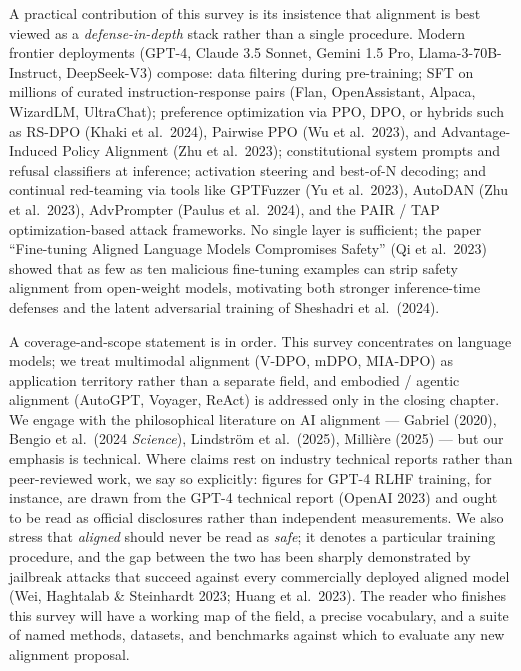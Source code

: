 A practical contribution of this survey is its insistence that alignment is best viewed as a \emph{defense-in-depth} stack rather than a single procedure. Modern frontier deployments (GPT-4, Claude 3.5 Sonnet, Gemini 1.5 Pro, Llama-3-70B-Instruct, DeepSeek-V3) compose: data filtering during pre-training; SFT on millions of curated instruction-response pairs (Flan, OpenAssistant, Alpaca, WizardLM, UltraChat); preference optimization via PPO, DPO, or hybrids such as RS-DPO (Khaki et al.~2024), Pairwise PPO (Wu et al.~2023), and Advantage-Induced Policy Alignment (Zhu et al.~2023); constitutional system prompts and refusal classifiers at inference; activation steering and best-of-N decoding; and continual red-teaming via tools like GPTFuzzer (Yu et al.~2023), AutoDAN (Zhu et al.~2023), AdvPrompter (Paulus et al.~2024), and the PAIR / TAP optimization-based attack frameworks. No single layer is sufficient; the paper ``Fine-tuning Aligned Language Models Compromises Safety'' (Qi et al.~2023) showed that as few as ten malicious fine-tuning examples can strip safety alignment from open-weight models, motivating both stronger inference-time defenses and the latent adversarial training of Sheshadri et al.~(2024).

A coverage-and-scope statement is in order. This survey concentrates on language models; we treat multimodal alignment (V-DPO, mDPO, MIA-DPO) as application territory rather than a separate field, and embodied / agentic alignment (AutoGPT, Voyager, ReAct) is addressed only in the closing chapter. We engage with the philosophical literature on AI alignment --- Gabriel (2020), Bengio et al.~(2024 \emph{Science}), Lindström et al.~(2025), Millière (2025) --- but our emphasis is technical. Where claims rest on industry technical reports rather than peer-reviewed work, we say so explicitly: figures for GPT-4 RLHF training, for instance, are drawn from the GPT-4 technical report (OpenAI 2023) and ought to be read as official disclosures rather than independent measurements. We also stress that \emph{aligned} should never be read as \emph{safe}; it denotes a particular training procedure, and the gap between the two has been sharply demonstrated by jailbreak attacks that succeed against every commercially deployed aligned model (Wei, Haghtalab \& Steinhardt 2023; Huang et al.~2023). The reader who finishes this survey will have a working map of the field, a precise vocabulary, and a suite of named methods, datasets, and benchmarks against which to evaluate any new alignment proposal.

